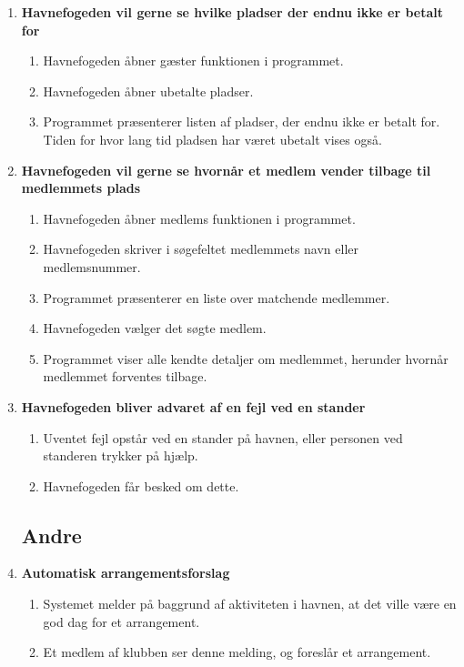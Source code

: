 \begin{enumerate}
    \item{\bf{Havnefogeden vil gerne se hvilke pladser der endnu ikke er betalt for}}
      \begin{enumerate}
        \item Havnefogeden åbner gæster funktionen i programmet.
        \item Havnefogeden åbner ubetalte pladser.
        \item Programmet præsenterer listen af pladser, der endnu ikke er betalt for. Tiden for hvor lang tid pladsen har været ubetalt vises også.
      \end{enumerate}

    \item{\bf{Havnefogeden vil gerne se hvornår et medlem vender tilbage til medlemmets plads}}
      \begin{enumerate}
        \item Havnefogeden åbner medlems funktionen i programmet.
        \item Havnefogeden skriver i søgefeltet medlemmets navn eller medlemsnummer.
        \item Programmet præsenterer en liste over matchende medlemmer.
        \item Havnefogeden vælger det søgte medlem.
        \item Programmet viser alle kendte detaljer om medlemmet, herunder hvornår medlemmet forventes tilbage.
      \end{enumerate}

    \item{\bf{Havnefogeden bliver advaret af en fejl ved en stander}}
      \begin{enumerate}
        \item Uventet fejl opstår ved en stander på havnen, eller personen ved standeren trykker på hjælp.
        \item Havnefogeden får besked om dette.
      \end{enumerate}

\subsection{Andre}

	
    \item{\bf{Automatisk arrangementsforslag}}
      \begin{enumerate}
        \item Systemet melder på baggrund af aktiviteten i havnen, at det ville være en god dag for et arrangement.
        \item Et medlem af klubben ser denne melding, og foreslår et arrangement.
      \end{enumerate}


\end{enumerate}
